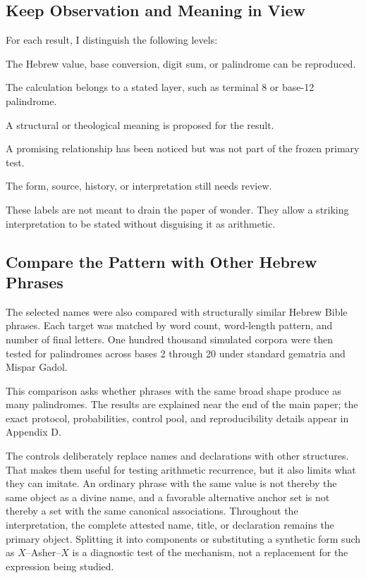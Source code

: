 \subsection{Keep Observation and Meaning in View}

For each result, I distinguish the following levels:

\begin{description}[leftmargin=3.3cm]
\item[Calculated] The Hebrew value, base conversion, digit sum, or palindrome can be reproduced.
\item[Classified] The calculation belongs to a stated layer, such as terminal 8 or base-12 palindrome.
\item[Interpreted] A structural or theological meaning is proposed for the result.
\item[Exploratory] A promising relationship has been noticed but was not part of the frozen primary test.
\item[Unresolved] The form, source, history, or interpretation still needs review.
\end{description}

These labels are not meant to drain the paper of wonder. They allow a striking interpretation to be stated without disguising it as arithmetic.

\subsection{Compare the Pattern with Other Hebrew Phrases}

The selected names were also compared with structurally similar Hebrew Bible phrases. Each target was matched by word count, word-length pattern, and number of final letters. One hundred thousand simulated corpora were then tested for palindromes across bases 2 through 20 under standard gematria and Mispar Gadol.

This comparison asks whether phrases with the same broad shape produce as many palindromes. The results are explained near the end of the main paper; the exact protocol, probabilities, control pool, and reproducibility details appear in Appendix D.

The controls deliberately replace names and declarations with other structures. That makes them useful for testing arithmetic recurrence, but it also limits what they can imitate. An ordinary phrase with the same value is not thereby the same object as a divine name, and a favorable alternative anchor set is not thereby a set with the same canonical associations. Throughout the interpretation, the complete attested name, title, or declaration remains the primary object. Splitting it into components or substituting a synthetic form such as $X$--Asher--$X$ is a diagnostic test of the mechanism, not a replacement for the expression being studied.

